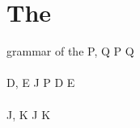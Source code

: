 \section{The \JoinCalc}

\begin{definition}{grammar of the \joincalc}
  P, Q
  \grmr {}
  \altn {}
  \altn P \jpar Q
  \altn \jnullproc
  \\ \\
  D, E
  \grmr J \jrct P
  \altn D \jcon E
  \altn \jnulldef
  \\ \\
  J, K
  \grmr {}
  \altn J \jpat K
\end{definition}
